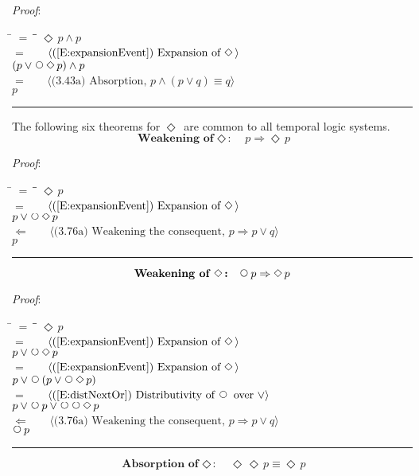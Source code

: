 \documentclass[12pt, fleqn, leqno]{article}
\newcommand{\lgap}{2pt}                             %
\newcommand{\mymathindent}{24pt}                    %
\newcommand{\impl}{\ensuremath{\Rightarrow}}        %
\newcommand{\foll}{\ensuremath{\Leftarrow}}         %
\newcommand{\Next}{\;\,\text{\raisebox{3.5pt}{\circle{6}}}}
\newcommand{\Event}{\Diamond\,}
\newcommand{\myqed}{\rule[-.23ex]{1.2ex}{2.0ex}}
\newcommand{\myqedtab}{\hspace{384pt}}              %
\newcommand{\Gll} {\langle}                         %
\newcommand{\Ggg} {\rangle}                         %
\newcommand{\Hint}[1]     {\ \ \ $\Gll              \mbox{#1} \Ggg$ }   %
\begin{document}
\emph{Proof}:
\begin{tabbing}
\hspace{\mymathindent} \= $= \;$ \= \myqedtab \= \kill
  \> \>   $\Event p \land p$\\[\lgap]
  \> $=$  \>  \Hint{(\ref{E:expansionEvent}) Expansion of $\Event$}\\[\lgap]
  \> \>   $(p \lor \Next\Event p) \land p$\\[\lgap]
  \> $=$  \>  \Hint{(3.43a) Absorption, $p\land (p \lor q) \equiv q$}\\[\lgap]
  \> \>   $p$ \quad \myqed
\end{tabbing}

The following six theorems for $\Event$ are common to all temporal logic systems.
\begin{equation}\label{E:impEvent}
\textbf{Weakening of $\Event$:}\quad p \impl \Event p
\end{equation}

\emph{Proof}:
\begin{tabbing}
\hspace{\mymathindent} \= $= \;$ \= \myqedtab \= \kill
  \> \>   $\Event p$\\[\lgap]
  \> $=$  \>  \Hint{(\ref{E:expansionEvent}) Expansion of $\Event$}\\[\lgap]
  \> \>   $p \lor \Next\Event p$\\[\lgap]
  \> $\foll$  \>  \Hint{(3.76a) Weakening the consequent, $p \impl p\lor q$}\\[\lgap]
  \> \>   $p$ \quad \myqed
\end{tabbing}
\begin{equation}\label{E:nextEvent}
\textbf{Weakening of $\Event$:}\quad \Next p \impl \Event p
\end{equation}

\emph{Proof}:
\begin{tabbing}
\hspace{\mymathindent} \= $= \;$ \= \myqedtab \= \kill
  \> \>   $\Event p$\\[\lgap]
  \> $=$  \>  \Hint{(\ref{E:expansionEvent}) Expansion of $\Event$}\\[\lgap]
  \> \>   $p \lor \Next\Event p$\\[\lgap]
  \> $=$  \>  \Hint{(\ref{E:expansionEvent}) Expansion of $\Event$}\\[\lgap]
  \> \>   $p \lor \Next (p \lor \Next\Event p)$\\[\lgap]
  \> $=$  \>  \Hint{(\ref{E:distNextOr}) Distributivity of $\Next$ over $\lor$}\\[\lgap]
  \> \>   $p \lor \Next p \lor \Next\Next\Event p$\\[\lgap]
  \> $\foll$  \>  \Hint{(3.76a) Weakening the consequent, $p \impl p\lor q$}\\[\lgap]
  \> \>   $\Next p$ \quad \myqed
\end{tabbing}
\begin{equation}\label{E:IdemEvent}
\textbf{Absorption of $\Event$:}\quad \Event\Event p \equiv \Event p
\end{equation}
\end{document}

